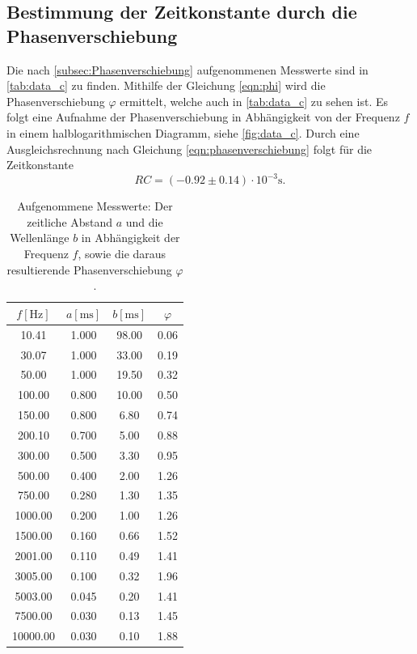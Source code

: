 \subsection{Bestimmung der Zeitkonstante durch die Phasenverschiebung}
\label{subsec:Aufgabe_C}
Die nach \autoref{subsec:Phasenverschiebung} aufgenommenen Messwerte sind in \autoref{tab:data_c} zu finden.
Mithilfe der Gleichung \eqref{eqn:phi} wird die Phasenverschiebung $\varphi$ ermittelt, welche auch in \autoref{tab:data_c} zu sehen ist.
Es folgt eine Aufnahme der Phasenverschiebung in Abhängigkeit von der Frequenz $f$ in einem halblogarithmischen Diagramm, siehe \autoref{fig:data_c}.
Durch eine Ausgleichsrechnung nach Gleichung \eqref{eqn:phasenverschiebung} folgt für die Zeitkonstante
\begin{equation*}
  RC = (-0.92 \pm 0.14) \cdot 10^{-3} \si{\second}.
\end{equation*}

\begin{table}
  \centering
  \caption{Aufgenommene Messwerte: Der zeitliche  Abstand $a$ und die Wellenlänge $b$ in Abhängigkeit der Frequenz $f$, sowie die daraus resultierende Phasenverschiebung $\varphi$.}
  \label{tab:data_c}
  \begin{tabular}{c c c c}
    \toprule
    $f [\si{\hertz}]$ & $a [\si{\milli\second}]$ & $b [\si{\milli\second}]$ & $\varphi$ \\
    \midrule
    10.41       &     1.000     &   98.00   &   0.06\\
    30.07       &     1.000     &   33.00   &   0.19\\
    50.00       &     1.000     &   19.50   &   0.32\\
    100.00      &     0.800     &   10.00   &   0.50\\
    150.00      &     0.800     &    6.80   &   0.74\\
    200.10      &     0.700     &    5.00   &   0.88\\
    300.00      &     0.500     &    3.30   &   0.95\\
    500.00      &     0.400     &    2.00   &   1.26\\
    750.00      &     0.280     &    1.30   &   1.35\\
    1000.00     &     0.200     &    1.00   &   1.26\\
    1500.00     &     0.160     &    0.66   &   1.52\\
    2001.00     &     0.110     &    0.49   &   1.41\\
    3005.00     &     0.100     &    0.32   &   1.96\\
    5003.00     &     0.045     &    0.20   &   1.41\\
    7500.00     &     0.030     &    0.13   &   1.45\\
    10000.00    &     0.030     &    0.10   &   1.88\\
    \bottomrule
  \end{tabular}
\end{table}

